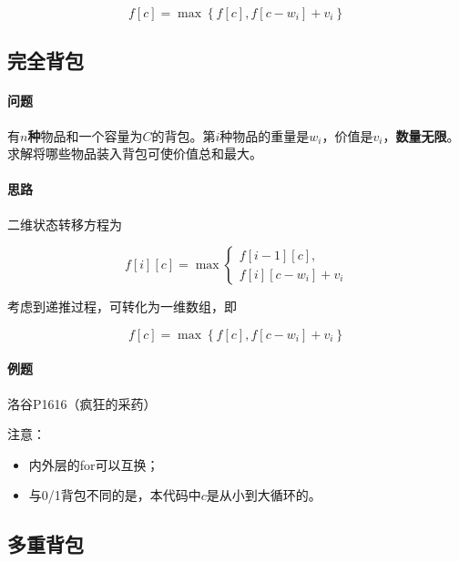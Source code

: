 \begin{equation}
  f[c] = \max\left\{f[c], f[c-w_i]+v_i\right\}
\end{equation}



\subsection{完全背包}

\paragraph{问题} 有$n$\textbf{种}物品和一个容量为$C$的背包。第$i$种物品的重量是$w_i$，价值是$v_i$，\textbf{数量无限}。求解将哪些物品装入背包可使价值总和最大。

\paragraph{思路} 二维状态转移方程为 

\begin{equation}
  f[i][c]=\max \left\{
    \begin{array}{l}
      f[i-1][c], \\
      f[i][c-w_i]+v_i
    \end{array}
  \right.
\end{equation}

考虑到递推过程，可转化为一维数组，即

\begin{equation}
  f[c]=\max\left\{f[c],f[c-w_i]+v_i\right\}
\end{equation}

\paragraph{例题} 洛谷P1616（疯狂的采药）



注意：

\begin{itemize}
  \item 内外层的for可以互换；
  \item 与0/1背包不同的是，本代码中$c$是从小到大循环的。
\end{itemize}

\subsection{多重背包}

